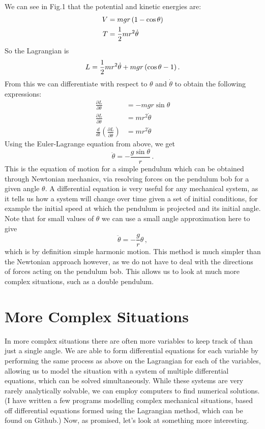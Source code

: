 \documentclass{article}
\begin{document}
We can see in Fig.1 that the potential and kinetic energies are:
\begin{align*}
    V &= mgr \thinspace (1 - \cos{\theta}) \\
    T &= \frac{1}{2} mr^2\dot{\theta}
\end{align*}
So the Lagrangian is
$$ L = \frac{1}{2}mr^2 \dot{\theta} + mgr \thinspace(\cos{\theta} - 1) \, .$$
From this we can differentiate with respect to \(\theta\) and \(\dot{\theta}\) to obtain the following expressions:
\begin{align*}
    \frac{\partial L}{\partial \theta} &= -mgr\sin{\theta} \\
    \frac{\partial L}{\partial \dot{\theta}} &= mr^2 \dot{\theta} \\
    \frac{d}{dt} \left( \frac{\partial L}{\partial \dot{\theta}} \right) &= mr^2\ddot{\theta}  
\end{align*}
Using the Euler-Lagrange equation from above, we get
$$ \ddot{\theta} = -\frac{g\sin{\theta}}{r} \, .$$ 
This is the equation of motion for a simple pendulum which can be obtained through Newtonian mechanics, via resolving forces on the pendulum bob for a given angle \(\theta\). A differential equation is very useful for any mechanical system, as it tells us how a system will change over time given a set of initial conditions, for example the initial speed at which the pendulum is projected and its initial angle. Note that for small values of \(\theta\) we can use a small angle approximation here to give
$$ \ddot{\theta} = - \frac{g}{r} \theta \, ,$$
which is by definition simple harmonic motion. This method is much simpler than the Newtonian approach however, as we do not have to deal with the directions of forces acting on the pendulum bob. This allows us to look at much more complex situations, such as a double pendulum.

\section{More Complex Situations}
In more complex situations there are often more variables to keep track of than just a single angle. We are able to form differential equations for each variable by performing the same process as above on the Lagrangian for each of the variables, allowing us to model the situation with a system of multiple differential equations, which can be solved simultaneously. While these systems are very rarely analytically solvable, we can employ computers to find numerical solutions. (I have written a few programs modelling complex mechanical situations, based off differential equations formed using the Lagrangian method, which can be found on Github.) Now, as promised, let's look at something more interesting.
\end{document}
